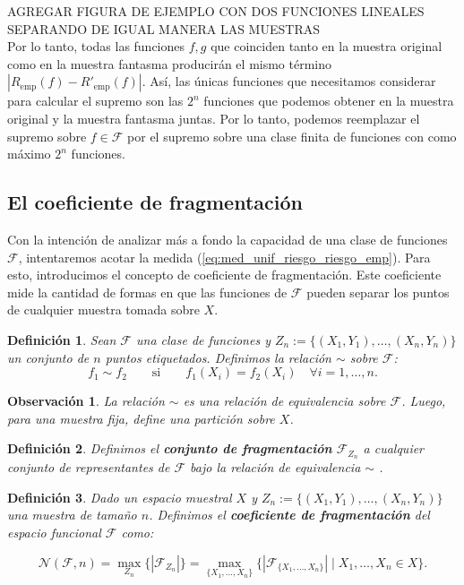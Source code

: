 \documentclass{article}
\newtheorem{dfn}{Definición}[subsection]
\newtheorem{obs}{Observación}[subsection]
\begin{document}
AGREGAR FIGURA DE EJEMPLO CON DOS FUNCIONES LINEALES SEPARANDO DE IGUAL MANERA LAS MUESTRAS\\

Por lo tanto, todas las funciones \(f, g\) que coinciden tanto en la muestra original como en la muestra fantasma 
producirán el mismo término \(|R_{\text{emp}}(f) - R'_{\text{emp}}(f)|\). Así, las únicas funciones que 
necesitamos considerar para calcular el supremo son las \(2^{n}\) funciones que podemos obtener en la muestra 
original y la muestra fantasma juntas. Por lo tanto, podemos reemplazar el supremo sobre \(f \in \mathcal{F}\) por el 
supremo sobre una clase finita de funciones con como máximo \(2^{n}\) funciones.\\


\subsection{ El coeficiente de fragmentación}

Con la intención de analizar más a fondo la capacidad de una clase de funciones 
\(\mathcal{F}\), intentaremos acotar la medida (\ref{eq:med_unif_riesgo_riesgo_emp}).
Para esto, introducimos el concepto de coeficiente de fragmentación.  Este coeficiente mide la 
cantidad de formas en que las funciones de \(\mathcal{F}\) pueden separar los puntos de cualquier muestra
tomada sobre $X$.\\

\begin{dfn}
    Sean \(\mathcal{F}\) una clase de funciones y \(Z_n := \{(X_1, Y_1), \dots, (X_n, Y_n)\}\) un conjunto de \(n\) puntos
    etiquetados. Definimos la relación $\sim$ sobre \(\mathcal{F}\):
        \[
        f_1 \sim f_2 \qquad \text{si} \qquad f_1(X_i) = f_2(X_i) \quad \forall i = 1, \dots, n.
        \]
\end{dfn}
\begin{obs}
    La relación \(\sim\) es una relación de equivalencia sobre \(\mathcal{F}\). Luego, para una muestra fija,
    define una partición sobre $X$.
\end{obs}
\begin{dfn}
    Definimos el \textbf{conjunto de fragmentación} \(\mathcal{F}_{Z_n}\) a cualquier conjunto de representantes de \(\mathcal{F}\)
    bajo la relación de equivalencia \(\sim\) .
\end{dfn}
\begin{dfn}
    Dado un espacio muestral $X$ y \(Z_n := \{(X_1, Y_1), \dots, (X_n, Y_n)\}\) una muestra de tamaño \(n\). Definimos el 
    \textbf{coeficiente de fragmentación} del espacio funcional $\mathcal{F}$ como:
    
    \[
    \mathcal{N}(\mathcal{F}, n) = \max_{Z_n} \{|\mathcal{F}_{Z_n}|\} = \max_{\{X_1, \dots, X_n\}}\{|\mathcal{F}_{\{X_1, \dots, X_n\}}| \mid X_1, \dots, X_n \in X\}. 
    \]\\
\end{dfn}
\end{document}
